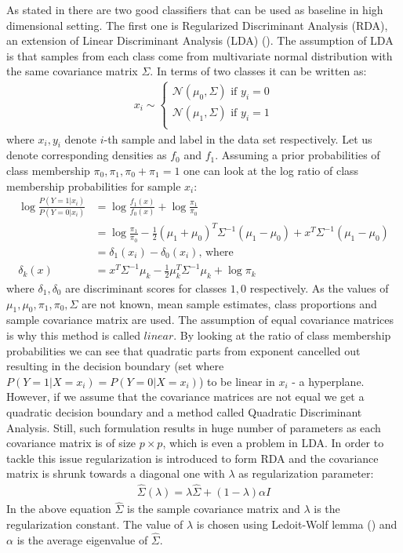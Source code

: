 \documentclass[shortabstract, english, mgr]{iithesis}
\begin{document}
As stated in \cite[chapter 18.2]{ESL2} there are two good classifiers that can be used as baseline in high dimensional setting. The first one is Regularized Discriminant Analysis (RDA), an extension of Linear Discriminant Analysis (LDA) (\cite[chapter 4.3]{ESL2}). The assumption of LDA is that samples from each class come from multivariate normal distribution with the same covariance matrix $\Sigma$. In terms of two classes it can be written as:
\begin{align*}
    x_i \sim \begin{cases}
    \mathcal{N}(\mu_0, \Sigma) \text{  if $y_i=0$} \\
    \mathcal{N}(\mu_1, \Sigma) \text{  if $y_i=1$} \\
    \end{cases}
\end{align*}
where $x_i, y_i$ denote $i$-th sample and label in the data set respectively. Let us denote corresponding densities as $f_0$ and $f_1$. Assuming a prior probabilities of class membership $\pi_0, \pi_1, \pi_0 + \pi_1=1$ one can look at the log ratio of class membership probabilities for sample $x_i$:
\begin{align} 
\log \frac{P(Y=1 | x_i)}{P(Y=0 | x_i)}&=\log \frac{f_1(x)}{f_{0}(x)}+\log \frac{\pi_1}{\pi_{0}} \nonumber \\&=\log \frac{\pi_1}{\pi_{0}}-\frac{1}{2}\left(\mu_1+\mu_{0}\right)^{T} \Sigma^{-1}\left(\mu_1-\mu_{0}\right) + x^{T} \Sigma^{-1}\left(\mu_1-\mu_{0}\right) \nonumber\\ &= \delta_1(x_i) - \delta_0(x_i) \text{, where} \nonumber\\
\delta_{k}(x)&=x^{T} \Sigma^{-1} \mu_{k}-\frac{1}{2} \mu_{k}^{T} \Sigma^{-1} \mu_{k}+\log \pi_{k} \label{eq:dslda}
\end{align}
where $\delta_1, \delta_0$ are discriminant scores for classes $1,0$ respectively. As the values of $\mu_1, \mu_0, \pi_1, \pi_0, \Sigma$ are not known, mean sample estimates, class proportions and sample covariance matrix are used. The assumption of equal covariance matrices is why this method is called $linear$. By looking at the ratio of class membership probabilities we can see that quadratic parts from exponent cancelled out resulting in the decision boundary (set where $P(Y=1 | X=x_i) = P(Y=0 | X=x_i)$) to be linear in $x_i$ - a hyperplane. However, if we assume that the covariance matrices are not equal we get a quadratic decision boundary and a method called Quadratic Discriminant Analysis. Still, such formulation results in huge number of parameters as each covariance matrix is of size $p \times p$, which is even a problem in LDA. In order to tackle this issue regularization is introduced to form RDA and the covariance matrix is shrunk towards a diagonal one with $\lambda$ as regularization parameter:
\begin{align*}
    \hat{\Sigma}(\lambda)=\lambda \hat{\Sigma}+(1-\lambda) \alpha I
\end{align*}
In the above equation $\hat{\Sigma}$ is the sample covariance matrix and $\lambda$ is the regularization constant. The value of $\lambda$ is chosen using Ledoit-Wolf lemma (\cite{honey}) and $\alpha$ is the average eigenvalue of $\hat{\Sigma}$.
\end{document}
